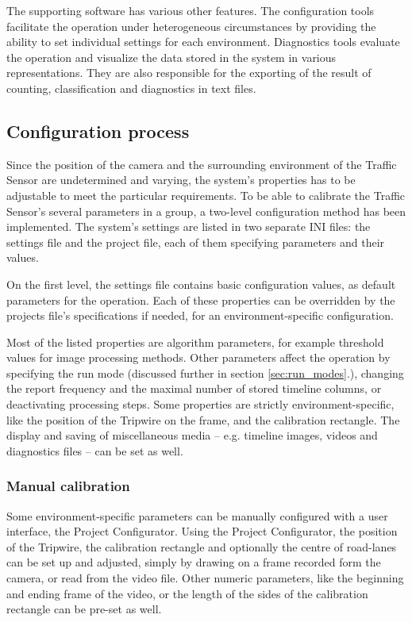 The supporting software has various other features.
The configuration tools facilitate the operation under heterogeneous circumstances by providing the ability to set individual settings for each environment.
Diagnostics tools evaluate the operation and visualize the data stored in the system in various representations.
They are also responsible for the exporting of the result of counting, classification and diagnostics in text files.
\subsection{Configuration process}\label{subs:ProjectConfigurator}
Since the position of the camera and the surrounding environment of the Traffic Sensor are undetermined and varying, the system's properties has to be adjustable to meet the particular requirements.
To be able to calibrate the Traffic Sensor's several parameters in a group, a two-level configuration method has been implemented.
The system's settings are listed in two separate INI files: the settings file and the project file, each of them specifying parameters and their values.

On the first level, the settings file contains basic configuration values, as default parameters for the operation.
Each of these properties can be overridden by the projects file's specifications if needed, for an environment-specific configuration.

Most of the listed properties are algorithm parameters, for example threshold values for image processing methods.
Other parameters affect the operation by specifying the run mode (discussed further in section \ref{sec:run_modes}.), changing the report frequency and the maximal number of stored timeline columns, or deactivating processing steps.
Some properties are strictly environment-specific, like the position of the Tripwire on the frame, and the calibration rectangle.
The display and saving of miscellaneous media -- e.g. timeline images, videos and diagnostics files -- can be set as well.

\subsubsection{Manual calibration}
Some environment-specific parameters can be manually configured with a user interface, the Project Configurator.
Using the Project Configurator, the position of the Tripwire, the calibration rectangle and optionally the centre of road-lanes can be set up and adjusted, simply by drawing on a frame recorded form the camera, or read from the video file.
Other numeric parameters, like the beginning and ending frame of the video, or the length of the sides of the calibration rectangle can be pre-set as well.

